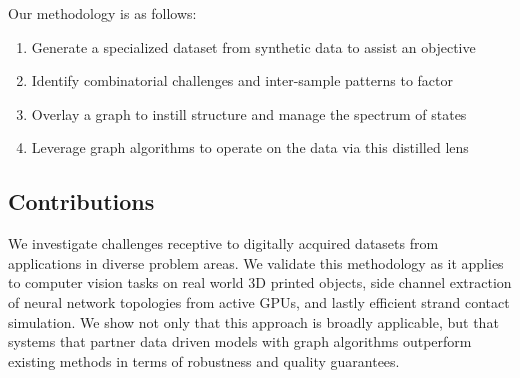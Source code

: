 \documentclass[12pt]{report}
\begin{document}
Our methodology is as follows:
\begin{enumerate}
    \item Generate a specialized dataset from synthetic data to assist an objective
    \item Identify combinatorial challenges and inter-sample patterns to factor
    \item Overlay a graph to instill structure and manage the spectrum of states
    \item Leverage graph algorithms to operate on the data via this distilled lens
\end{enumerate}

\subsection{Contributions}\label{sec:contributions}
We investigate challenges receptive to digitally acquired datasets 
from applications in diverse problem areas.
We validate this methodology as it applies to computer vision tasks on real world 3D printed
objects, side channel extraction of neural network topologies from
active GPUs, and lastly efficient strand contact simulation.
We show not only that this approach is broadly applicable, 
but that systems that partner data driven models with graph algorithms
outperform existing methods in terms of robustness and quality guarantees.

\end{document}
